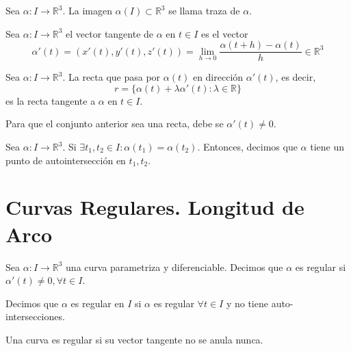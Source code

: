 \begin{defn}[Traza]
  Sea $\alpha: I \to \mathbb{R}^{3}$. La imagen $\alpha(I) \subset \mathbb{R}^{3}$ se llama traza de $\alpha$.
\end{defn}

\begin{defn}
  Sea $\alpha : I \to \mathbb{R}^{3}$ el vector tangente de $\alpha$ en $t \in I$ es el vector
  \[ 
    \alpha '(t) = (x'(t), y'(t), z'(t))
    = \lim_{h \to 0} \frac{\alpha(t + h) - \alpha(t)}{h} \in \mathbb{R}^{3}
  \] 
\end{defn}

\begin{defn}
  Sea $\alpha: I \to \mathbb{R}^{3}$. La recta que pasa por $\alpha(t)$ en dirección $\alpha'(t)$, es decir, 
  \[ 
    r = \{ \alpha(t) + \lambda \alpha'(t) : \lambda \in \mathbb{R} \} 
  \] 
  es la recta tangente a $\alpha$ en $t \in I$.
\end{defn}

\begin{obs}
  Para que el conjunto anterior sea una recta, debe se $\alpha'(t) \neq 0$.
\end{obs}

\begin{defn}[Autointersección]
  Sea $\alpha: I \to \mathbb{R}^{3}$. Si $\exists t_{1},t_{2}  \in I: \alpha(t_{1}) = \alpha(t_{2})$. Entonces, decimos que $\alpha$ tiene un punto de autointersección en $t_{1}, t_{2}$.
\end{defn}

\section{Curvas Regulares. Longitud de Arco}

\begin{defn}
  Sea $\alpha: I \to \mathbb{R}^{3}$ una curva parametriza y diferenciable. Decimos que $\alpha$ es regular si $\alpha'(t) \neq 0, \forall t \in I$.
\end{defn}

\begin{obs}
  Decimos que $\alpha$ es regular en $I$ si $\alpha$ es regular $\forall t \in I$ y no tiene auto-intersecciones.
\end{obs}

\begin{obs}
  Una curva es regular si su vector tangente no se anula nunca.
\end{obs}

